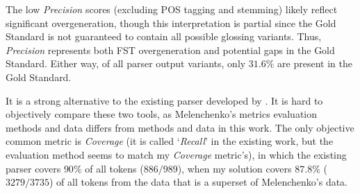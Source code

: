 The low \textit{Precision} scores (excluding POS tagging and stemming) likely reflect significant overgeneration, though this interpretation is partial since the Gold Standard is not guaranteed to contain all possible glossing variants. Thus, \textit{Precision} represents both FST overgeneration and potential gaps in the Gold Standard. Either way, of all parser output variants, only $31.6\%$ are present in the Gold Standard. 

It is a strong alternative to the existing parser developed by \textcite{melenchenko_2021_parser}. It is hard to objectively compare these two tools, as Melenchenko's metrics evaluation methods and data differs from methods and data in this work. The only objective common metric is \textit{Coverage} (it is called `\textit{Recall}' in the existing work, but the evaluation method seems to match my \textit{Coverage} metric's), in which the existing parser covers $90\%$ of all tokens ($886/989$), when my solution covers $87.8\%$ ($3279/3735$) of all tokens from the data that is a superset of Melenchenko's data.
